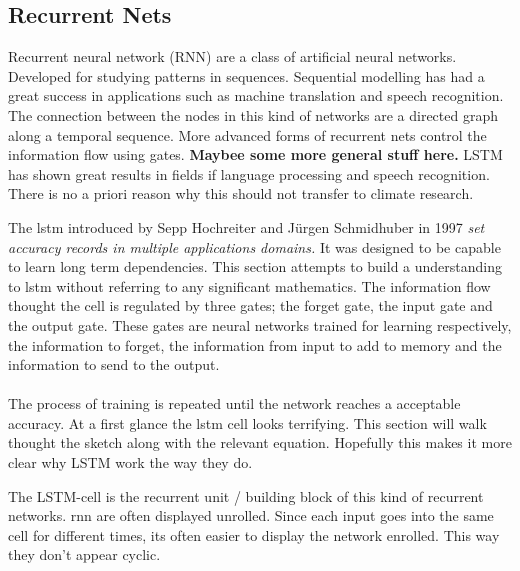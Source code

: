 \subsection{Recurrent Nets}
Recurrent neural network (RNN) are a class of artificial neural networks. Developed for studying patterns in sequences. Sequential modelling has had a great success in applications such as machine translation and speech recognition. The connection between the nodes in this kind of networks are a directed graph along a temporal sequence. More advanced forms of recurrent nets control the information flow using gates. \textbf{Maybee some more general stuff here.} LSTM has shown great results in fields if language processing and speech recognition. There is no a priori reason why this should not transfer to climate research. %

The \acrfull{lstm} introduced by Sepp Hochreiter and Jürgen Schmidhuber in 1997 \textit{set accuracy records in multiple applications domains.} It was designed to be capable to learn long term dependencies. This section attempts to build a understanding to \acrfull{lstm} without referring to any significant mathematics. The information flow thought the cell is regulated by three gates; the forget gate, the input gate and the output gate. These gates are neural networks trained for learning respectively, the information to forget, the information from input to add to memory and the information to send to the output.
\\ \\
The process of training is repeated until the network reaches a acceptable accuracy. At a first glance the \acrshort{lstm} cell looks terrifying. This section will walk thought the sketch along with the relevant equation. Hopefully this makes it more clear why LSTM work the way they do.

The LSTM-cell is the recurrent unit / building block of this kind of recurrent networks.
\acrshort{rnn} are often displayed unrolled. Since each input goes into the same cell for different times, its often easier to display the network enrolled. This way they don't appear cyclic.

